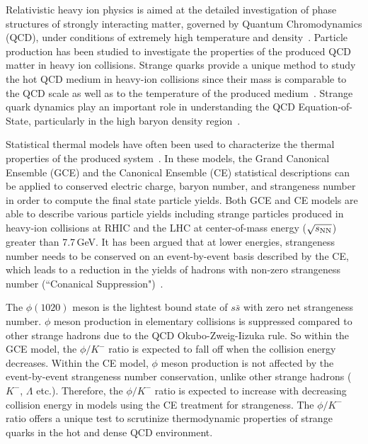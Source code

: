 \documentclass[%
 reprint,	
showpacs,
 amsmath,amssymb,
 aps,
 prc,
]{revtex4-1}
\begin{document}
\maketitle


Relativistic heavy ion physics is aimed at the detailed investigation of phase structures of strongly interacting matter, governed by Quantum Chromodynamics (QCD), under conditions of extremely high temperature and density~\cite{akiba2015hot,StarWhitePaper}. Particle production has been studied to investigate the properties of the produced QCD matter in heavy ion collisions. Strange quarks provide a unique method to study the hot QCD medium in heavy-ion collisions since their mass is comparable to the QCD scale as well as to the temperature of the produced medium~\cite{Rafelski:1982pu,Koch:1986ud}. Strange quark dynamics play an important role in understanding the QCD Equation-of-State, particularly in the high baryon density region~\cite{KO_sQM17,Danielewicz1592,Tetyana_ICNN,KO.PhysRevLett.55.2661,HADES.Ks2019457,CASSING.openCharm.2001753}. 

Statistical thermal models have often been used to characterize the thermal properties of the produced system~\cite{BraunMunzinger:2003zd,Redlich_CE}. In these models, the Grand Canonical Ensemble (GCE) and the Canonical Ensemble (CE) statistical descriptions can be applied to conserved electric charge, baryon number, and strangeness number in order to compute the final state particle yields. Both GCE and CE models are able to describe various particle yields including strange particles produced in heavy-ion collisions at RHIC and the LHC at center-of-mass energy ($\sqrt{s_{\rm NN}}$) greater than 7.7\,GeV. It has been argued that at lower energies, strangeness number needs to be conserved on an event-by-event basis described by the CE, which leads to a reduction in the yields of hadrons with non-zero strangeness number (``Conanical Suppression")~\cite{Redlich:2001kb}.

The $\phi(1020)$ meson is the lightest bound state of $s\bar{s}$ with zero net strangeness number. $\phi$ meson production in elementary collisions is suppressed compared to other strange hadrons due to the QCD Okubo-Zweig-Iizuka rule. So within the GCE model, the $\phi/K^-$ ratio is expected to fall off when the collision energy decreases. Within the CE model, $\phi$ meson production is not affected by the event-by-event strangeness number conservation, unlike other strange hadrons ($K^-$, $\Lambda$ etc.). Therefore, the $\phi/K^-$ ratio is expected to increase with decreasing collision energy in models using the CE treatment for strangeness. The $\phi/K^-$ ratio offers a unique test to scrutinize thermodynamic properties of strange quarks in the hot and dense QCD environment.
\end{document}
